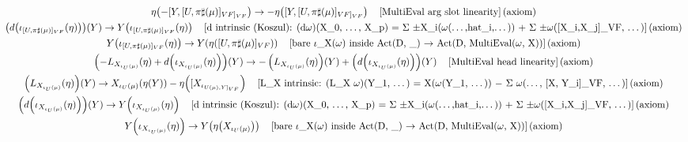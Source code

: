 \documentclass[11pt]{article}
\begin{document}
{\begin{gather*}
\eta\!\left(-[Y,[U,\pi\sharp(\mu)]_{VF]_{VF}}\right) \to -\eta\!\left([Y,[U,\pi\sharp(\mu)]_{VF]_{VF}}\right) \quad \text{[MultiEval arg slot linearity]\,(axiom)} \\
\left(d\!\left(\iota_{[U,\pi\sharp(\mu)]_{VF}}\!\left(\eta\right)\right)\right)\!\left(Y\right) \to Y\!\left(\iota_{[U,\pi\sharp(\mu)]_{VF}}\!\left(\eta\right)\right) \quad \text{[d intrinsic (Koszul): (d\ensuremath{\omega})(X\_0, \ensuremath{\dots}, X\_p) = \ensuremath{\Sigma} \ensuremath{\pm}X\_i(\ensuremath{\omega}(\ensuremath{\dots},hat\_i,\ensuremath{\dots})) + \ensuremath{\Sigma} \ensuremath{\pm}\ensuremath{\omega}([X\_i,X\_j]\_VF, \ensuremath{\dots})]\,(axiom)} \\
Y\!\left(\iota_{[U,\pi\sharp(\mu)]_{VF}}\!\left(\eta\right)\right) \to Y\!\left(\eta\!\left([U,\pi\sharp(\mu)]_{VF}\right)\right) \quad \text{[bare \ensuremath{\iota}\_X(\ensuremath{\omega}) inside Act(D, \_) \ensuremath{\to} Act(D, MultiEval(\ensuremath{\omega}, X))]\,(axiom)} \\
\left(-L_{X_{\iota_U(\mu)}}\!\left(\eta\right) + d\!\left(\iota_{X_{\iota_U(\mu)}}\!\left(\eta\right)\right)\right)\!\left(Y\right) \to -\left(L_{X_{\iota_U(\mu)}}\!\left(\eta\right)\right)\!\left(Y\right) + \left(d\!\left(\iota_{X_{\iota_U(\mu)}}\!\left(\eta\right)\right)\right)\!\left(Y\right) \quad \text{[MultiEval head linearity]\,(axiom)} \\
\left(L_{X_{\iota_U(\mu)}}\!\left(\eta\right)\right)\!\left(Y\right) \to X_{\iota_U(\mu)}\!\left(\eta\!\left(Y\right)\right) - \eta\!\left([X_{\iota_{U(\mu),Y]_{VF}}}\right) \quad \text{[L\_X intrinsic: (L\_X \ensuremath{\omega})(Y\_1, \ensuremath{\dots}) = X(\ensuremath{\omega}(Y\_1, \ensuremath{\dots})) \ensuremath{-} \ensuremath{\Sigma} \ensuremath{\omega}(\ensuremath{\dots}, [X, Y\_i]\_VF, \ensuremath{\dots})]\,(axiom)} \\
\left(d\!\left(\iota_{X_{\iota_U(\mu)}}\!\left(\eta\right)\right)\right)\!\left(Y\right) \to Y\!\left(\iota_{X_{\iota_U(\mu)}}\!\left(\eta\right)\right) \quad \text{[d intrinsic (Koszul): (d\ensuremath{\omega})(X\_0, \ensuremath{\dots}, X\_p) = \ensuremath{\Sigma} \ensuremath{\pm}X\_i(\ensuremath{\omega}(\ensuremath{\dots},hat\_i,\ensuremath{\dots})) + \ensuremath{\Sigma} \ensuremath{\pm}\ensuremath{\omega}([X\_i,X\_j]\_VF, \ensuremath{\dots})]\,(axiom)} \\
Y\!\left(\iota_{X_{\iota_U(\mu)}}\!\left(\eta\right)\right) \to Y\!\left(\eta\!\left(X_{\iota_U(\mu)}\right)\right) \quad \text{[bare \ensuremath{\iota}\_X(\ensuremath{\omega}) inside Act(D, \_) \ensuremath{\to} Act(D, MultiEval(\ensuremath{\omega}, X))]\,(axiom)} \\

\end{gather*}}
\end{document}
